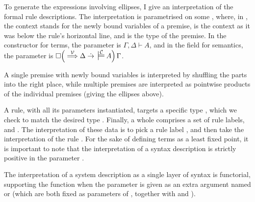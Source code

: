 To generate the expressions involving ellipses, I give an interpretation of the
formal rule descriptions.
The interpretation is parametrised on some
, where, in
\AgdaBound{,}\AgdaSpace{}\AgdaBound{$\Delta$}\AgdaSpace{}%
\AgdaBound{$\llbracket$}\AgdaSpace{}\AgdaBound{$\Gamma$}\AgdaSpace{}%
\AgdaBound{$\vdash$}\AgdaSpace{}\AgdaSpace{}%
\AgdaBound{$\rrbracket$}, the context \AgdaBound{$\Delta$} stands for the newly
bound variables of a premise, \AgdaBound{$\Gamma$} is the context as it was
below the rule's horizontal line, and  is the type of the premise.
In the  constructor for terms, the parameter is
$\Gamma, \Delta \vdash A$, and in the 
field for semantics, the parameter is
$\Box\plr{{} \env\V \Delta \dotto {} \sdtstile{}\C A}\,\Gamma$.

A single premise with newly bound variables is interpreted by shuffling the
parts into the right place, while multiple premises are interpreted as pointwise
products of the individual premises (giving the ellipses above).


A rule, with all its parameters instantiated, targets a specific type
, which we check to match the desired type .
Finally, a whole  comprises a set  of rule
labels, and \AgdaSpace{}\AgdaSymbol{:}\AgdaSpace{}%
\AgdaSpace{}\AgdaSymbol{$\to$}\AgdaSpace{}.
The interpretation of these data is to pick a rule label , and then
take the interpretation of the rule \AgdaSpace{}.
For the sake of defining terms as a least fixed point, it is important to note
that the interpretation of a syntax description is strictly positive in the
parameter \AgdaBound{,\_$\llbracket$\_$\vdash$\_$\rrbracket$}.


The interpretation of a system description as a single layer of syntax is
functorial, supporting the  function when the parameter
\AgdaBound{,\_$\llbracket$\_$\vdash$\_$\rrbracket$} is given as an extra
argument named  or  (which are both fixed as
parameters of , together with \AgdaBound{$\Gamma$} and
\AgdaBound{$\Delta$}).

